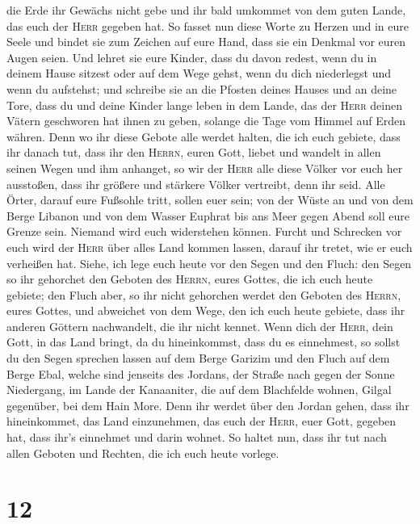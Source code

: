 die Erde ihr Gewächs nicht gebe und ihr bald umkommet von dem guten
Lande, das euch der \textsc{Herr} gegeben hat.  So fasset
nun diese Worte zu Herzen und in eure Seele und bindet sie zum Zeichen
auf eure Hand, dass sie ein Denkmal vor euren Augen seien.
 Und lehret sie eure Kinder, dass du davon redest, wenn
du in deinem Hause sitzest oder auf dem Wege gehst, wenn du dich
niederlegst und wenn du aufstehst;  und schreibe sie an
die Pfosten deines Hauses und an deine Tore,  dass du und
deine Kinder lange leben in dem Lande, das der \textsc{Herr} deinen
Vätern geschworen hat ihnen zu geben, solange die Tage vom Himmel auf
Erden währen.  Denn wo ihr diese Gebote alle werdet
halten, die ich euch gebiete, dass ihr danach tut, dass ihr den
\textsc{Herrn}, euren Gott, liebet und wandelt in allen seinen Wegen und
ihm anhanget,  so wir der \textsc{Herr} alle diese Völker
vor euch her ausstoßen, dass ihr größere und stärkere Völker vertreibt,
denn ihr seid.  Alle Örter, darauf eure Fußsohle tritt,
sollen euer sein; von der Wüste an und von dem Berge Libanon und von dem
Wasser Euphrat bis ans Meer gegen Abend soll eure Grenze sein.
 Niemand wird euch widerstehen können. Furcht und
Schrecken vor euch wird der \textsc{Herr} über alles Land kommen lassen,
darauf ihr tretet, wie er euch verheißen hat.  Siehe, ich
lege euch heute vor den Segen und den Fluch:  den Segen
so ihr gehorchet den Geboten des \textsc{Herrn}, eures Gottes, die ich
euch heute gebiete;  den Fluch aber, so ihr nicht
gehorchen werdet den Geboten des \textsc{Herrn}, eures Gottes, und
abweichet von dem Wege, den ich euch heute gebiete, dass ihr anderen
Göttern nachwandelt, die ihr nicht kennet.  Wenn dich der
\textsc{Herr}, dein Gott, in das Land bringt, da du hineinkommst, dass
du es einnehmest, so sollst du den Segen sprechen lassen auf dem Berge
Garizim und den Fluch auf dem Berge Ebal,  welche sind
jenseits des Jordans, der Straße nach gegen der Sonne Niedergang, im
Lande der Kanaaniter, die auf dem Blachfelde wohnen, Gilgal gegenüber,
bei dem Hain More.  Denn ihr werdet über den Jordan
gehen, dass ihr hineinkommet, das Land einzunehmen, das euch der
\textsc{Herr}, euer Gott, gegeben hat, dass ihr's einnehmet und darin
wohnet.  So haltet nun, dass ihr tut nach allen Geboten
und Rechten, die ich euch heute vorlege.

\hypertarget{section-11}{%
\section{12}\label{section-11}}

